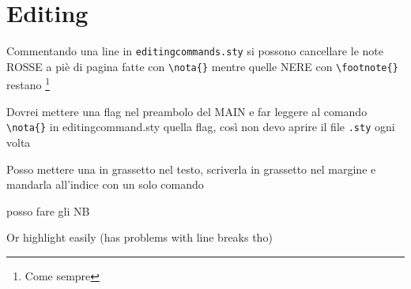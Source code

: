 
\section{Editing}
Commentando una line in \verb|editingcommands.sty| si possono cancellare le note ROSSE a piè di pagina fatte con \verb|\nota{}|%
mentre quelle NERE con \verb|\footnote{}| restano%
\footnote{Come sempre}


{\color{red} Dovrei mettere una flag nel preambolo del MAIN e far leggere al comando \verb|\nota{}| in editingcommand.sty quella flag, così non devo aprire il file \verb|.sty| ogni volta}


Posso mettere una  in grassetto nel testo, scriverla in grassetto nel margine e mandarla all'indice con un solo comando

\nb posso fare gli NB

Or highlight easily  (has problems with line breaks tho)
